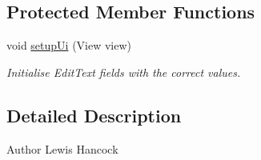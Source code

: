 \subsection*{Protected Member Functions}
\begin{DoxyCompactItemize}
\item 
void \hyperlink{classuk_1_1ac_1_1swan_1_1digitaltrails_1_1fragments_1_1_edit_waypoint_dialog_fragment_ada4d70217eaebd633c3e15fa620d1512}{setup\+Ui} (View view)
\begin{DoxyCompactList}\small\item\em Initialise Edit\+Text fields with the correct values. \end{DoxyCompactList}\end{DoxyCompactItemize}


\subsection{Detailed Description}
\begin{DoxyAuthor}{Author}
Lewis Hancock 
\end{DoxyAuthor}


